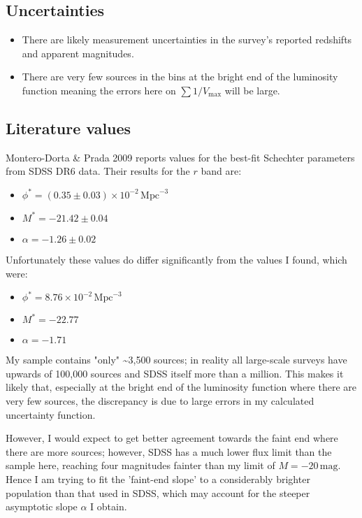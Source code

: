 \documentclass[11pt]{article}
\providecommand{\tightlist}{%
      \setlength{\itemsep}{0pt}\setlength{\parskip}{0pt}}
\begin{document}
\subsection{Uncertainties}\label{uncertainties}

\begin{itemize}
\tightlist
\item
  There are likely measurement uncertainties in the survey's reported
  redshifts and apparent magnitudes.
\item
  There are very few sources in the bins at the bright end of the
  luminosity function meaning the errors here on
  \(\sum 1/V_{\mathrm{max}}\) will be large.
\end{itemize}

\subsection{Literature values}\label{literature-values}

Montero-Dorta \& Prada 2009 reports values for the best-fit Schechter
parameters from SDSS DR6 data. Their results for the \(r\) band are:

\begin{itemize}
\tightlist
\item
  \(\phi^*=(0.35\pm 0.03)\times 10^{-2}\,\mathrm{Mpc}^{-3}\)
\item
  \(M^*=-21.42\pm 0.04\)
\item
  \(\alpha =-1.26\pm 0.02\)
\end{itemize}

Unfortunately these values do differ significantly from the values I
found, which were:

\begin{itemize}
\tightlist
\item
  \(\phi^*=8.76\times 10^{-2}\,\mathrm{Mpc}^{-3}\)
\item
  \(M^*=-22.77\)
\item
  \(\alpha =-1.71\)
\end{itemize}

My sample contains "only" \textasciitilde{}3,500 sources; in reality all
large-scale surveys have upwards of 100,000 sources and SDSS itself more
than a million. This makes it likely that, especially at the bright end
of the luminosity function where there are very few sources, the
discrepancy is due to large errors in my calculated uncertainty
function.

However, I would expect to get better agreement towards the faint end
where there are more sources; however, SDSS has a much lower flux limit
than the sample here, reaching four magnitudes fainter than my limit of
\(M=-20\,\mathrm{mag}\). Hence I am trying to fit the 'faint-end slope'
to a considerably brighter population than that used in SDSS, which may
account for the steeper asymptotic slope \(\alpha\) I obtain.
\end{document}
